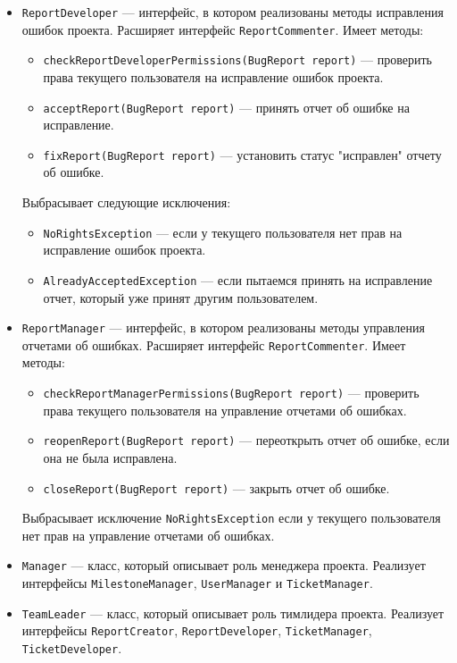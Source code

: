 \begin{itemize}
\item \texttt{ReportDeveloper} --- интерфейс, в котором реализованы методы исправления ошибок проекта. Расширяет интерфейс \texttt{ReportCommenter}. Имеет методы:
	\begin{itemize}
	\item \texttt{checkReportDeveloperPermissions(BugReport report)} --- проверить права текущего пользователя на исправление ошибок проекта.
	\item \texttt{acceptReport(BugReport report)} --- принять отчет об ошибке на исправление.
	\item \texttt{fixReport(BugReport report)} --- установить статус "исправлен" отчету об ошибке.
	\end{itemize}
	
	Выбрасывает следующие исключения:
	\begin{itemize}
	\item \texttt{NoRightsException} --- если у текущего пользователя нет прав на исправление ошибок проекта.
	\item \texttt{AlreadyAcceptedException} --- если пытаемся принять на исправление отчет, который уже принят другим пользователем.
	\end{itemize}
	
\item \texttt{ReportManager} --- интерфейс, в котором реализованы методы управления отчетами об ошибках. Расширяет интерфейс \texttt{ReportCommenter}. Имеет методы:
	\begin{itemize}
	\item \texttt{checkReportManagerPermissions(BugReport report)} --- проверить права текущего пользователя на  управление отчетами об ошибках.
	\item \texttt{reopenReport(BugReport report)} --- переоткрыть отчет об ошибке, если она не была исправлена.
	\item \texttt{closeReport(BugReport report)} --- закрыть отчет об ошибке.
	\end{itemize}
	
	Выбрасывает исключение \texttt{NoRightsException} если у текущего пользователя нет прав на управление отчетами об ошибках.

\item \texttt{Manager} --- класс, который описывает роль менеджера проекта. Реализует интерфейсы \texttt{MilestoneManager}, \texttt{UserManager} и \texttt{TicketManager}.

\item \texttt{TeamLeader} --- класс, который описывает роль тимлидера проекта. Реализует интерфейсы \texttt{ReportCreator}, \texttt{ReportDeveloper}, \texttt{TicketManager}, \texttt{TicketDeveloper}.


\end{itemize}

